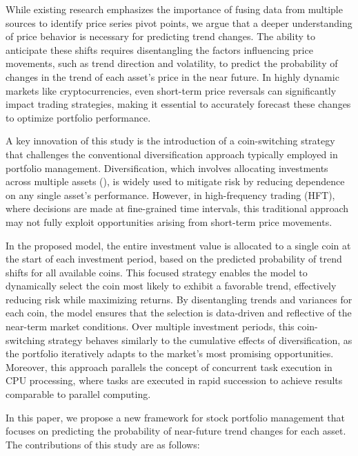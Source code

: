 While existing research emphasizes the importance of fusing data from multiple sources to identify price series pivot points, we argue that a deeper understanding of price behavior is necessary for predicting trend changes. The ability to anticipate these shifts requires disentangling the factors influencing price movements, such as trend direction and volatility, to predict the probability of changes in the trend of each asset's price in the near future. In highly dynamic markets like cryptocurrencies, even short-term price reversals can significantly impact trading strategies, making it essential to accurately forecast these changes to optimize portfolio performance.

A key innovation of this study is the introduction of a coin-switching strategy that challenges the conventional diversification approach typically employed in portfolio management. Diversification, which involves allocating investments across multiple assets (\citet{markovitz1959portfolio}), is widely used to mitigate risk by reducing dependence on any single asset's performance. However, in high-frequency trading (HFT), where decisions are made at fine-grained time intervals, this traditional approach may not fully exploit opportunities arising from short-term price movements.

In the proposed model, the entire investment value is allocated to a single coin at the start of each investment period, based on the predicted probability of trend shifts for all available coins. This focused strategy enables the model to dynamically select the coin most likely to exhibit a favorable trend, effectively reducing risk while maximizing returns. By disentangling trends and variances for each coin, the model ensures that the selection is data-driven and reflective of the near-term market conditions. Over multiple investment periods, this coin-switching strategy behaves similarly to the cumulative effects of diversification, as the portfolio iteratively adapts to the market's most promising opportunities. Moreover, this approach parallels the concept of concurrent task execution in CPU processing, where tasks are executed in rapid succession to achieve results comparable to parallel computing.

In this paper, we propose a new framework for stock portfolio management that focuses on predicting the probability of near-future trend changes for each asset. The contributions of this study are as follows:


